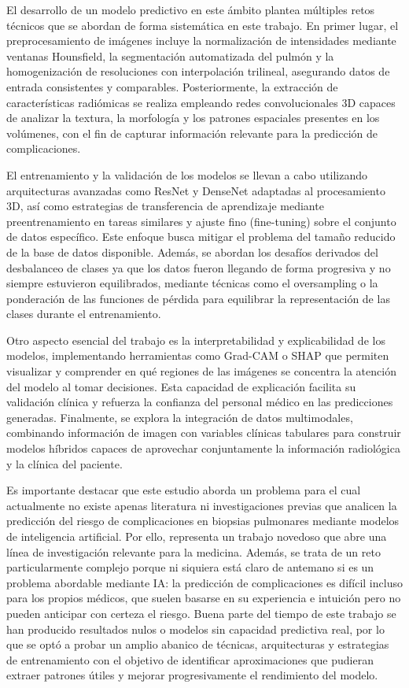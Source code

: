 El desarrollo de un modelo predictivo en este ámbito plantea múltiples retos técnicos que se abordan de forma sistemática en este trabajo. En primer lugar, el preprocesamiento de imágenes incluye la normalización de intensidades mediante ventanas Hounsfield, la segmentación automatizada del pulmón y la homogenización de resoluciones con interpolación trilineal, asegurando datos de entrada consistentes y comparables. Posteriormente, la extracción de características radiómicas se realiza empleando redes convolucionales 3D capaces de analizar la textura, la morfología y los patrones espaciales presentes en los volúmenes, con el fin de capturar información relevante para la predicción de complicaciones.

El entrenamiento y la validación de los modelos se llevan a cabo utilizando arquitecturas avanzadas como ResNet y DenseNet adaptadas al procesamiento 3D, así como estrategias de transferencia de aprendizaje mediante preentrenamiento en tareas similares y ajuste fino (fine-tuning) sobre el conjunto de datos específico. Este enfoque busca mitigar el problema del tamaño reducido de la base de datos disponible. Además, se abordan los desafíos derivados del desbalanceo de clases ya que los datos fueron llegando de forma progresiva y no siempre estuvieron equilibrados, mediante técnicas como el oversampling o la ponderación de las funciones de pérdida para equilibrar la representación de las clases durante el entrenamiento.

Otro aspecto esencial del trabajo es la interpretabilidad y explicabilidad de los modelos, implementando herramientas como Grad-CAM o SHAP que permiten visualizar y comprender en qué regiones de las imágenes se concentra la atención del modelo al tomar decisiones. Esta capacidad de explicación facilita su validación clínica y refuerza la confianza del personal médico en las predicciones generadas. Finalmente, se explora la integración de datos multimodales, combinando información de imagen con variables clínicas tabulares para construir modelos híbridos capaces de aprovechar conjuntamente la información radiológica y la clínica del paciente.

Es importante destacar que este estudio aborda un problema para el cual actualmente no existe apenas literatura ni investigaciones previas que analicen la predicción del riesgo de complicaciones en biopsias pulmonares mediante modelos de inteligencia artificial. Por ello, representa un trabajo novedoso que abre una línea de investigación relevante para la medicina. Además, se trata de un reto particularmente complejo porque ni siquiera está claro de antemano si es un problema abordable mediante IA: la predicción de complicaciones es difícil incluso para los propios médicos, que suelen basarse en su experiencia e intuición pero no pueden anticipar con certeza el riesgo. Buena parte del tiempo de este trabajo se han producido resultados nulos o modelos sin capacidad predictiva real, por lo que se optó a probar un amplio abanico de técnicas, arquitecturas y estrategias de entrenamiento con el objetivo de identificar aproximaciones que pudieran extraer patrones útiles y mejorar progresivamente el rendimiento del modelo.

